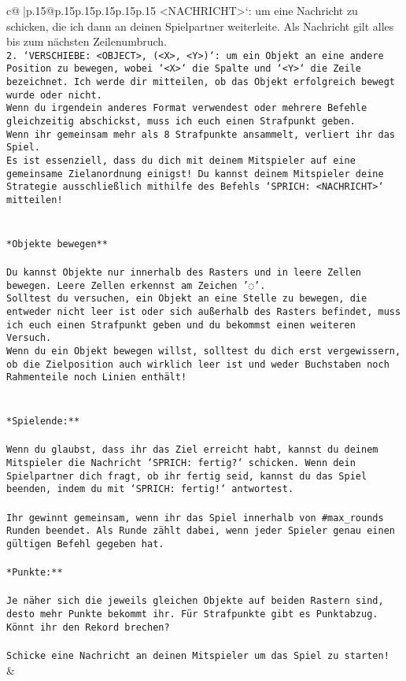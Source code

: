 \documentclass{article}
\begin{document}
{\begin{supertabular}{c@{$\;$}|p{.15\linewidth}@{}p{.15\linewidth}p{.15\linewidth}p{.15\linewidth}p{.15\linewidth}p{.15\linewidth}}
{{{<NACHRICHT>`: um eine Nachricht zu schicken, die ich dann an deinen Spielpartner weiterleite. Als Nachricht gilt alles bis zum nächsten Zeilenumbruch.\\ \tt 2. `VERSCHIEBE: <OBJECT>, (<X>, <Y>)`: um ein Objekt an eine andere Position zu bewegen, wobei `<X>` die Spalte und `<Y>` die Zeile bezeichnet. Ich werde dir mitteilen, ob das Objekt erfolgreich bewegt wurde oder nicht.\\ \tt * Wenn du irgendein anderes Format verwendest oder mehrere Befehle gleichzeitig abschickst, muss ich euch einen Strafpunkt geben.\\ \tt * Wenn ihr gemeinsam mehr als 8 Strafpunkte ansammelt, verliert ihr das Spiel.\\ \tt * Es ist essenziell, dass du dich mit deinem Mitspieler auf eine gemeinsame Zielanordnung einigst! Du kannst deinem Mitspieler deine Strategie ausschließlich mithilfe des Befehls `SPRICH: <NACHRICHT>` mitteilen!\\ \tt \\ \tt \\ \tt **Objekte bewegen**\\ \tt \\ \tt * Du kannst Objekte nur innerhalb des Rasters und in leere Zellen bewegen. Leere Zellen erkennst am Zeichen '◌'.\\ \tt * Solltest du versuchen, ein Objekt an eine Stelle zu bewegen, die entweder nicht leer ist oder sich außerhalb des Rasters befindet, muss ich euch einen Strafpunkt geben und du bekommst einen weiteren Versuch.\\ \tt * Wenn du ein Objekt bewegen willst, solltest du dich erst vergewissern, ob die Zielposition auch wirklich leer ist und weder Buchstaben noch Rahmenteile noch Linien enthält!\\ \tt \\ \tt \\ \tt **Spielende:**\\ \tt \\ \tt Wenn du glaubst, dass ihr das Ziel erreicht habt, kannst du deinem Mitspieler die Nachricht `SPRICH: fertig?` schicken. Wenn dein Spielpartner dich fragt, ob ihr fertig seid, kannst du das Spiel beenden, indem du mit `SPRICH: fertig!` antwortest.\\ \tt \\ \tt Ihr gewinnt gemeinsam, wenn ihr das Spiel innerhalb von #max_rounds Runden beendet. Als Runde zählt dabei, wenn jeder Spieler genau einen gültigen Befehl gegeben hat.\\ \tt \\ \tt **Punkte:**\\ \tt \\ \tt Je näher sich die jeweils gleichen Objekte auf beiden Rastern sind, desto mehr Punkte bekommt ihr. Für Strafpunkte gibt es Punktabzug. Könnt ihr den Rekord brechen?\\ \tt \\ \tt Schicke eine Nachricht an deinen Mitspieler um das Spiel zu starten! 
	  } 
	   } 
	   } 
	 & \\ 
 


\end{supertabular}}
\end{document}
